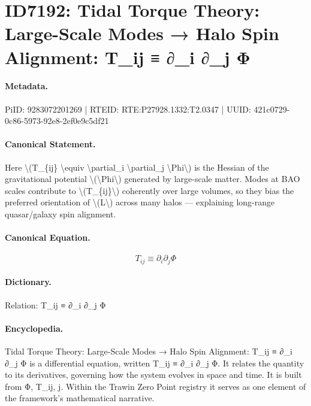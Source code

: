 \section*{ID7192: Tidal Torque Theory: Large-Scale Modes → Halo Spin Alignment: T\_ij ≡ ∂\_i ∂\_j Φ}
\paragraph{Metadata.}
PiID: 9283072201269 | RTEID: RTE:P27928.1332:T2.0347 | UUID: 421c0729-0c86-5973-92e8-2ef0e9c5df21

\paragraph{Canonical Statement.}
Here \textbackslash{}(T\_\{ij\} \textbackslash{}equiv \textbackslash{}partial\_i \textbackslash{}partial\_j \textbackslash{}Phi\textbackslash{}) is the Hessian of the gravitational potential \textbackslash{}(\textbackslash{}Phi\textbackslash{}) generated by large-scale matter. Modes at BAO scales contribute to \textbackslash{}(T\_\{ij\}\textbackslash{}) coherently over large volumes, so they bias the preferred orientation of \textbackslash{}(L\textbackslash{}) across many halos — explaining long-range quasar/galaxy spin alignment.

\paragraph{Canonical Equation.}
\[
T_{ij} \equiv \partial_i \partial_j \Phi
\]

\paragraph{Dictionary.}
Relation: T\_ij ≡ ∂\_i ∂\_j Φ

\paragraph{Encyclopedia.}
Tidal Torque Theory: Large-Scale Modes → Halo Spin Alignment: T\_ij ≡ ∂\_i ∂\_j Φ is a differential equation, written T\_ij ≡ ∂\_i ∂\_j Φ. It relates the quantity to its derivatives, governing how the system evolves in space and time. It is built from Φ, T\_ij, j. Within the Trawin Zero Point registry it serves as one element of the framework's mathematical narrative.
